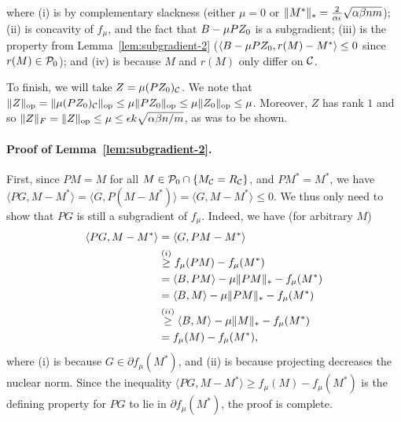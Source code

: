 where (i) is by complementary slackness (either $\mu = 0$ or $\|M^*\|_* = \frac{2}{\alpha\epsilon}\sqrt{\alpha\beta nm}$); 
(ii) is concavity of $f_{\mu}$, and the fact that $B - \mu PZ_0$ is a subgradient;  
(iii) is the property from Lemma~\ref{lem:subgradient-2} ($\langle B - \mu PZ_0, r(M) - M^* \rangle \leq 0$ since 
$r(M) \in \mathcal{P}_0$); and (iv) is because $M$ and $r(M)$ only differ on $\mathcal{C}$.

To finish, we will take $Z = \mu (PZ_0)_{\mathcal{C}}$. We note that
$\|Z\|_{\mathrm{op}} = \|\mu (PZ_0)_{\mathcal{C}}\|_{\mathrm{op}} \leq \mu \|PZ_0\|_{\mathrm{op}} \leq \mu \|Z_0\|_{\mathrm{op}} \leq \mu$.
Moreover, $Z$ has rank $1$ and so $\|Z\|_F = \|Z\|_{\mathrm{op}} \leq \mu \leq \epsilon k\sqrt{\alpha\beta n/m}$, as was to be shown.

\paragraph{Proof of Lemma~\ref{lem:subgradient-2}.}
First, since $PM = M$ for all $M \in \mathcal{P}_0 \cap \{M_{\mathcal{C}} = R_{\mathcal{C}}\}$, and $PM^* = M^*$, 
we have $\langle PG, M-M^* \rangle = \langle G, P(M-M^*) \rangle = \langle G, M-M^* \rangle \leq 0$. 
We thus only need to show that $PG$ is still a subgradient of $f_{\mu}$. Indeed, we have (for arbitrary $M$)
\begin{align}
\langle PG, M-M^* \rangle &= \langle G, PM - M^* \rangle \\
 &\stackrel{(i)}{\geq} f_{\mu}(PM) - f_{\mu}(M^*) \\
 &= \langle B, PM \rangle - \mu \|PM\|_* - f_{\mu}(M^*) \\
 &= \langle B, M \rangle - \mu \|PM\|_* - f_{\mu}(M^*) \\
 &\stackrel{(ii)}{\geq} \langle B, M \rangle - \mu \|M\|_* - f_{\mu}(M^*) \\
 &= f_{\mu}(M) - f_{\mu}(M^*),
\end{align}
where (i) is because $G \in \partial f_{\mu}(M^*)$, and (ii) is because projecting 
decreases the nuclear norm. Since the inequality $\langle PG, M-M^* \rangle \geq f_{\mu}(M) - f_{\mu}(M^*)$ 
is the defining property for $PG$ to lie in $\partial f_{\mu}(M^*)$, the proof is complete.
